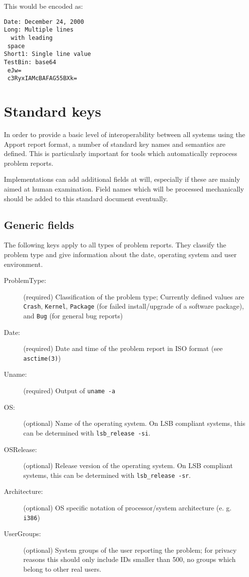 \documentclass[DIV12,halfparskip]{scrartcl}
\begin{document}
This would be encoded as:

\begin{verbatim}
Date: December 24, 2000
Long: Multiple lines
  with leading
 space
Short1: Single line value
TestBin: base64
 eJw=
 c3RyxIAMcBAFAG55BXk=
\end{verbatim}

\section{Standard keys}

In order to provide a basic level of interoperability between all systems using
the Apport report format, a number of standard key names and semantics are
defined. This is particularly important for tools which automatically reprocess
problem reports.

Implementations can add additional fields at will, especially if these are
mainly aimed at human examination. Field names which will be processed
mechanically should be added to this standard document eventually.

\subsection{Generic fields}

The following keys apply to all types of problem reports. They classify the
problem type and give information about the date, operating system and user
environment.

\begin{description}
    \item [ProblemType:] (required) Classification of the problem type;
    Currently defined values are \verb!Crash!, \verb!Kernel!, \verb!Package!
    (for failed install/upgrade of a software package), and \verb!Bug! (for
    general bug reports)

    \item [Date:] (required) Date and time of the problem report in ISO format
    (see \verb!asctime(3)!)

    \item [Uname:] (required) Output of \verb!uname -a!

    \item [OS:] (optional) Name of the operating system. On LSB compliant
    systems, this can be determined with \verb!lsb_release -si!.

    \item [OSRelease:] (optional) Release version of the operating system. On
    LSB compliant systems, this can be determined with \verb!lsb_release -sr!.

    \item [Architecture:] (optional) OS specific notation of
    processor/system architecture (e. g. \verb!i386!)

    \item [UserGroups:] (optional) System groups of the user reporting the
    problem; for privacy reasons this should only include IDs smaller than 500,
    no groups which belong to other real users.
\end{description}
\end{document}
